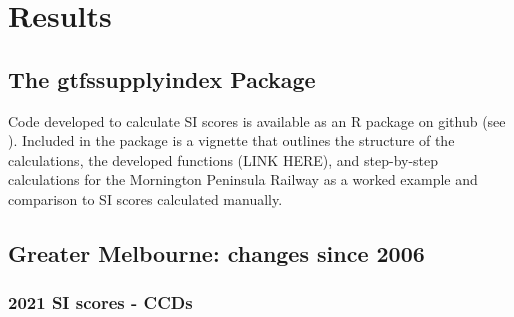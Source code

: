 \documentclass[preprint, 3p,
authoryear]{elsarticle} %
\begin{document}
\section{Results}\label{results}

\subsection{The gtfssupplyindex
Package}\label{the-gtfssupplyindex-package}

Code developed to calculate SI scores is available as an R package on
github (see \citet{gtfssupplyindex_github}). Included in the package is
a vignette that outlines the structure of the calculations, the
developed functions (LINK HERE), and step-by-step calculations for the
Mornington Peninsula Railway as a worked example and comparison to SI
scores calculated manually.

\subsection{Greater Melbourne: changes since
2006}\label{greater-melbourne-changes-since-2006}

\subsubsection{2021 SI scores - CCDs}\label{si-scores---ccds}
\end{document}
